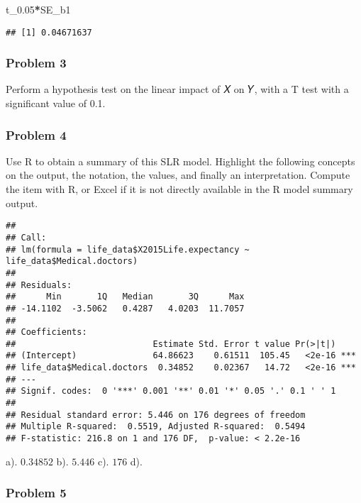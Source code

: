 \documentclass[
]{article}
\newenvironment{Shaded}{\begin{snugshade}}{\end{snugshade}}
\newcommand{\FloatTok}[1]{\textcolor[rgb]{0.00,0.00,0.81}{#1}}
\newcommand{\FunctionTok}[1]{\textcolor[rgb]{0.13,0.29,0.53}{\textbf{#1}}}
\newcommand{\NormalTok}[1]{#1}
\newcommand{\OtherTok}[1]{\textcolor[rgb]{0.56,0.35,0.01}{#1}}
\newcommand{\SpecialCharTok}[1]{\textcolor[rgb]{0.81,0.36,0.00}{\textbf{#1}}}
\begin{document}
\begin{Shaded}
\begin{Highlighting}[]
\NormalTok{t\_0}\FloatTok{.05}\SpecialCharTok{*}\NormalTok{SE\_b1}
\end{Highlighting}
\end{Shaded}

\begin{verbatim}
## [1] 0.04671637
\end{verbatim}

\subsubsection{Problem 3}\label{problem-3}

Perform a hypothesis test on the linear impact of 𝑋 on 𝑌, with a T test
with a significant value of 0.1.

\subsubsection{Problem 4}\label{problem-4}

Use R to obtain a summary of this SLR model. Highlight the following
concepts on the output, the notation, the values, and finally an
interpretation. Compute the item with R, or Excel if it is not directly
available in the R model summary output.

\begin{Shaded}
\end{Shaded}

\begin{verbatim}
## 
## Call:
## lm(formula = life_data$X2015Life.expectancy ~ life_data$Medical.doctors)
## 
## Residuals:
##      Min       1Q   Median       3Q      Max 
## -14.1102  -3.5062   0.4287   4.0203  11.7057 
## 
## Coefficients:
##                           Estimate Std. Error t value Pr(>|t|)    
## (Intercept)               64.86623    0.61511  105.45   <2e-16 ***
## life_data$Medical.doctors  0.34852    0.02367   14.72   <2e-16 ***
## ---
## Signif. codes:  0 '***' 0.001 '**' 0.01 '*' 0.05 '.' 0.1 ' ' 1
## 
## Residual standard error: 5.446 on 176 degrees of freedom
## Multiple R-squared:  0.5519, Adjusted R-squared:  0.5494 
## F-statistic: 216.8 on 1 and 176 DF,  p-value: < 2.2e-16
\end{verbatim}

a). \(0.34852\) b). \(5.446\) c). \(176\) d).

\subsubsection{Problem 5}\label{problem-5}
\end{document}
